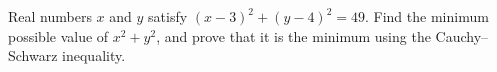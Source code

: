 Real numbers $x$ and $y$ satisfy $(x-3)^2+(y-4)^2=49$. Find the minimum possible value of $x^2+y^2$, and prove that it is the minimum using the Cauchy--Schwarz inequality.
